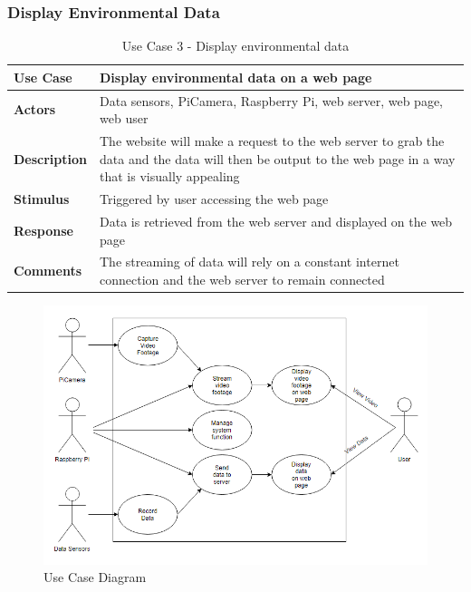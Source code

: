 \documentclass[10pt,a4paper]{article}
\begin{document}
\subsubsection{Display Environmental Data}
\begin{table}[h!]
\centering
\begin{tabular}{p{2cm}p{9cm}}
\toprule
\textbf{Use Case}    & Display environmental data on a web page \\ \midrule
\textbf{Actors}      & Data sensors, PiCamera, Raspberry Pi, web server, web page, web user                                                                          \\
\textbf{Description} & The website will make a request to the web server to grab the data and the data will then be output to the web page in a way that is visually appealing         \\
\textbf{Stimulus}    & Triggered by user accessing the web page\\
\textbf{Response}    & Data is retrieved from the web server and displayed on the web page              \\
\textbf{Comments}    & The streaming of data will rely on a constant internet connection and the web server to remain connected \\ \bottomrule
\end{tabular}
\caption{Use Case 3 - Display environmental data}
\label{tab:useCase3}
\end{table}

\begin{figure}[H]
\centering
  \includegraphics[width=\linewidth]{images/use_case_diagram.png}
  \caption{Use Case Diagram}
  \label{fig:usecasediagram}
\end{figure}
\end{document}
